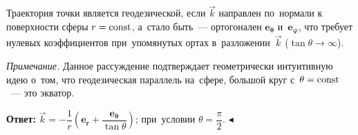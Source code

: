 \documentclass{weekly}
\begin{document}
Траектория точки является геодезической, если $\vec k$
направлен по~нормали к поверхности сферы $r = \mathrm{const}$,
а~стало быть~--- ортогонален $\mathbf{e_\theta}$
и~$\mathbf{e_\varphi}$, что требует нулевых коэффициентов
при~упомянутых ортах в~разложении~$\vec k$
($\tan\theta \to \infty$).

\textsl{Примечание.} Данное рассуждение подтверждает
геометрически интуитивную идею о~том, что геодезическая параллель
на~сфере, большой круг с~$\theta = \mathrm{const}$~--- это экватор.

\textbf{Ответ:}\quad
$\vec k = -\dfrac{1}{r} \left( \mathbf{e_r} +
    \dfrac{\mathbf{e_\theta}}{\tan\theta} \right)$;\qquad
при~условии $\theta = \dfrac{\pi}{2}$.
\hfill $\blacktriangleleft$
\end{document}
